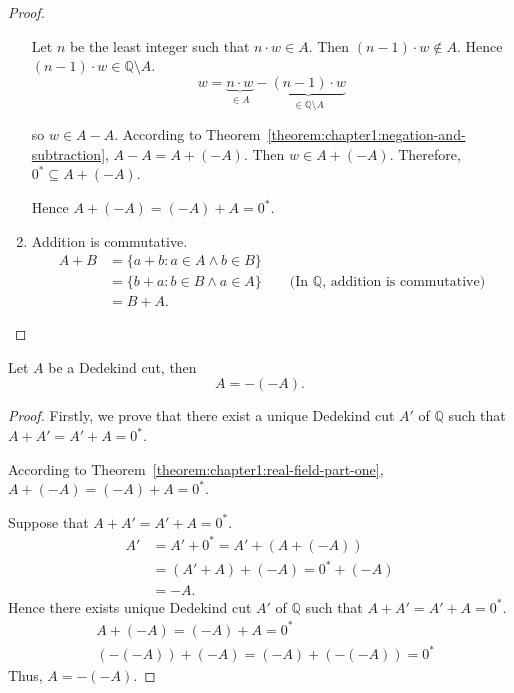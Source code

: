 \begin{proof}
\begin{enumerate}[label = (F\arabic*)]
              Let $n$ be the least integer such that $n\cdot w\in A$. Then $(n - 1)\cdot w\notin A$. Hence $(n - 1)\cdot w\in\mathbb{Q}\setminus A$.
              \[
                  w = \underbrace{n\cdot w}_{\in A} - \underbrace{(n - 1)\cdot w}_{\in\mathbb{Q}\setminus A}
              \]

              so $w\in A - A$. According to Theorem~\ref{theorem:chapter1:negation-and-subtraction}, $A - A = A + (-A)$. Then $w\in A + (-A)$. Therefore, ${0}^{*}\subseteq A + (-A)$.
              \bigskip

              Hence $A + (-A) = (-A) + A = {0}^{*}$.
        \item Addition is commutative.
              \begin{align*}
                  A + B & = \{ a + b : a\in A\land b\in B \}                                                        \\
                        & = \{ b + a : b\in B\land a\in A \}\qquad\text{(In $\mathbb{Q}$, addition is commutative)} \\
                        & = B + A.
              \end{align*}
    \end{enumerate}
\end{proof}

\begin{theorem}\label{theorem:chapter1:negation-is-an-involution}
    Let $A$ be a Dedekind cut, then
    \[
        A = -(-A).
    \]
\end{theorem}

\begin{proof}
    Firstly, we prove that there exist a unique Dedekind cut $A'$ of $\mathbb{Q}$ such that $A + A' = A' + A = {0}^{*}$.

    According to Theorem~\ref{theorem:chapter1:real-field-part-one}, $A + (-A) = (-A) + A = {0}^{*}$.

    Suppose that $A + A' = A' + A = {0}^{*}$.
    \begin{align*}
        A' & = A' + {0}^{*} = A' + (A + (-A))   \\
           & = (A' + A) + (-A) = {0}^{*} + (-A) \\
           & = -A.
    \end{align*}
    Hence there exists unique Dedekind cut $A'$ of $\mathbb{Q}$ such that $A + A' = A' + A = {0}^{*}$.
    \begin{align*}
         & A + (-A) = (-A) + A = {0}^{*}             \\
         & (-(-A)) + (-A) = (-A) + (-(-A)) = {0}^{*}
    \end{align*}
    Thus, $A = -(-A)$.
\end{proof}

